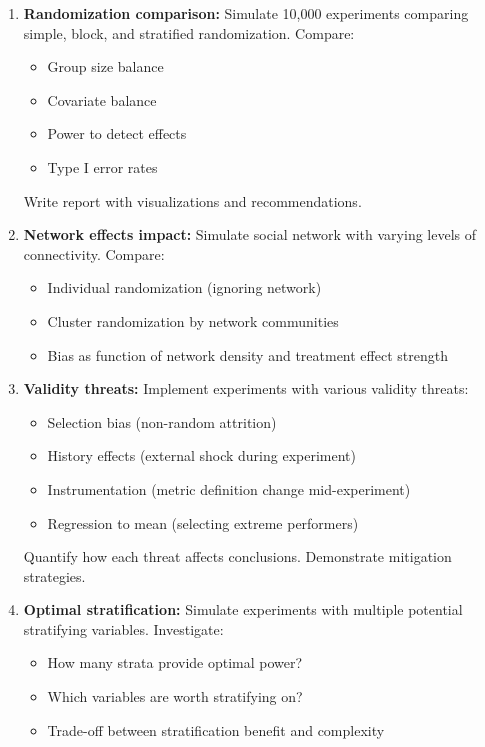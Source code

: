 \begin{enumerate}
    \item \textbf{Randomization comparison:} Simulate 10,000 experiments comparing simple, block, and stratified randomization. Compare:
    \begin{itemize}
        \item Group size balance
        \item Covariate balance
        \item Power to detect effects
        \item Type I error rates
    \end{itemize}
    Write report with visualizations and recommendations.

    \item \textbf{Network effects impact:} Simulate social network with varying levels of connectivity. Compare:
    \begin{itemize}
        \item Individual randomization (ignoring network)
        \item Cluster randomization by network communities
        \item Bias as function of network density and treatment effect strength
    \end{itemize}

    \item \textbf{Validity threats:} Implement experiments with various validity threats:
    \begin{itemize}
        \item Selection bias (non-random attrition)
        \item History effects (external shock during experiment)
        \item Instrumentation (metric definition change mid-experiment)
        \item Regression to mean (selecting extreme performers)
    \end{itemize}
    Quantify how each threat affects conclusions. Demonstrate mitigation strategies.

    \item \textbf{Optimal stratification:} Simulate experiments with multiple potential stratifying variables. Investigate:
    \begin{itemize}
        \item How many strata provide optimal power?
        \item Which variables are worth stratifying on?
        \item Trade-off between stratification benefit and complexity
    \end{itemize}
\end{enumerate}
